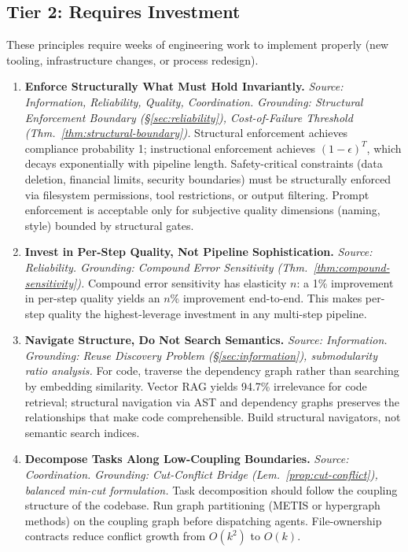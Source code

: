 \documentclass[11pt, a4paper, logo, copyright]{googledeepmind}
\begin{document}
\subsection{Tier 2: Requires Investment}
\label{sec:tier2}

These principles require weeks of engineering work to implement properly (new tooling, infrastructure changes, or process redesign).

\begin{enumerate}[label=\textbf{P\arabic*.}, leftmargin=3em, resume]

\item \textbf{Enforce Structurally What Must Hold Invariantly.}
\emph{Source: Information, Reliability, Quality, Coordination. Grounding: Structural Enforcement Boundary (\S\ref{sec:reliability}), Cost-of-Failure Threshold (Thm.~\ref{thm:structural-boundary}).}
Structural enforcement achieves compliance probability 1; instructional enforcement achieves $(1-\epsilon)^T$, which decays exponentially with pipeline length. Safety-critical constraints (data deletion, financial limits, security boundaries) must be structurally enforced via filesystem permissions, tool restrictions, or output filtering. Prompt enforcement is acceptable only for subjective quality dimensions (naming, style) bounded by structural gates.

\item \textbf{Invest in Per-Step Quality, Not Pipeline Sophistication.}
\emph{Source: Reliability. Grounding: Compound Error Sensitivity (Thm.~\ref{thm:compound-sensitivity}).}
Compound error sensitivity has elasticity $n$: a 1\% improvement in per-step quality yields an $n$\% improvement end-to-end. This makes per-step quality the highest-leverage investment in any multi-step pipeline.

\item \textbf{Navigate Structure, Do Not Search Semantics.}
\emph{Source: Information. Grounding: Reuse Discovery Problem (\S\ref{sec:information}), submodularity ratio analysis.}
For code, traverse the dependency graph rather than searching by embedding similarity. Vector RAG yields 94.7\% irrelevance for code retrieval; structural navigation via AST and dependency graphs preserves the relationships that make code comprehensible. Build structural navigators, not semantic search indices.

\item \textbf{Decompose Tasks Along Low-Coupling Boundaries.}
\emph{Source: Coordination. Grounding: Cut-Conflict Bridge (Lem.~\ref{prop:cut-conflict}), balanced min-cut formulation.}
Task decomposition should follow the coupling structure of the codebase. Run graph partitioning (METIS or hypergraph methods) on the coupling graph before dispatching agents. File-ownership contracts reduce conflict growth from $O(k^2)$ to $O(k)$.


\end{enumerate}
\end{document}
